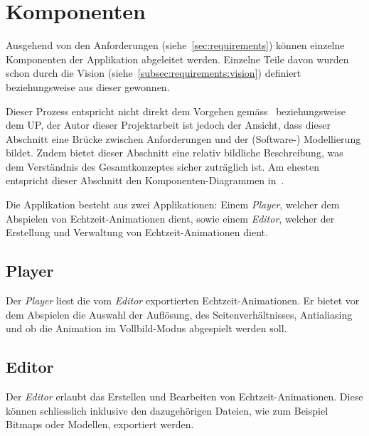 
\section{Komponenten}
\label{sec:main-components}

Ausgehend von den Anforderungen (siehe~\autoref{sec:requirements}) können einzelne
Komponenten der Applikation abgeleitet werden. Einzelne Teile davon wurden
schon durch die Vision (siehe~\autoref{subsec:requirements:vision}) definiert
beziehungsweise aus dieser gewonnen.

Dieser Prozess entspricht nicht direkt dem Vorgehen
gemäss~\cite{larman_applying_2004} beziehungsweise dem UP, der Autor dieser
Projektarbeit ist jedoch der Ansicht, dass dieser Abschnitt eine Brücke
zwischen Anforderungen und der (Software-) Modellierung bildet. Zudem bietet
dieser Abschnitt eine relativ bildliche Beschreibung, was dem Verständnis des
Gesamtkonzeptes sicher zuträglich ist. Am ehesten entspricht dieser Abschnitt
den Komponenten-Diagrammen in~\cite[S. 653 bis 654]{larman_applying_2004}.

Die Applikation besteht aus zwei Applikationen: Einem \textit{Player},
welcher dem Abspielen von Echtzeit-Animationen dient, sowie einem \textit{Editor},
welcher der Erstellung und Verwaltung von Echtzeit-Animationen dient.

\subsection{Player}
\label{subsec:main-components:player}

Der \textit{Player} liest die vom \textit{Editor} exportierten
Echtzeit-Animationen. Er bietet vor dem Abspielen die Auswahl der Auflösung,
des Seitenverhältnisses, Antialiasing und ob die Animation im Vollbild-Modus
abgespielt werden soll.

\subsection{Editor}
\label{subsec:main-components:editor}

Der \textit{Editor} erlaubt das Erstellen und Bearbeiten von
Echtzeit-Animationen. Diese können schliesslich inklusive den
dazugehörigen Dateien, wie zum Beispiel Bitmaps oder Modellen, exportiert
werden.

